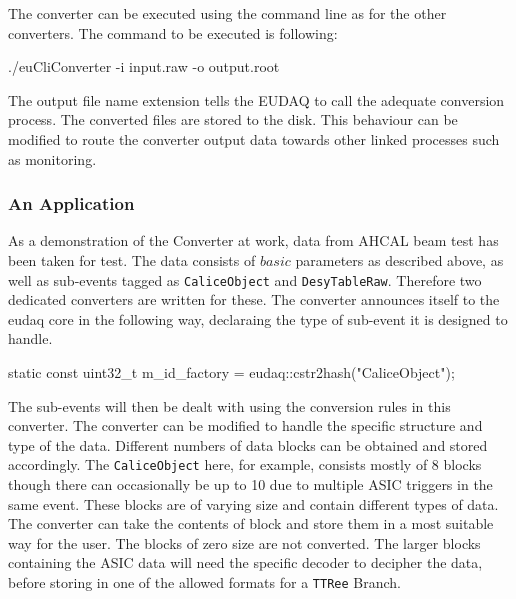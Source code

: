  The converter can be executed using the command line as for the other converters. The command to be executed is following:
\begin{listing}[mybash]
./euCliConverter -i input.raw -o output.root
\end{listing}
 The output file name extension tells the EUDAQ to call the adequate conversion process. The converted files are stored to the disk. This behaviour can be modified to route the converter output data towards other linked processes such as monitoring. 

\subsubsection{An Application} 
As a demonstration of the Converter at work, data from AHCAL beam test has been taken for test. The data consists of $basic$ parameters as described above, as well as sub-events tagged as \lstinline[style=cpp]{CaliceObject} and \lstinline[style=cpp]{DesyTableRaw}. Therefore two dedicated converters are written for these. The converter announces itself to the eudaq core in the following way, declaraing the type of sub-event it is designed to handle.  

\begin{listing}[mybash]
static const uint32_t m_id_factory = eudaq::cstr2hash("CaliceObject");
\end{listing}

The sub-events will then be dealt with using the conversion rules in this converter. The converter can be modified to handle the specific structure and type of the data. Different numbers of data blocks can be obtained and stored accordingly. The \lstinline[style=cpp]{CaliceObject} here, for example, consists mostly of 8 blocks though there can occasionally be up to 10 due to multiple ASIC triggers in the same event. These blocks are of varying size and contain different types of data. The converter can take the contents of block and store them in a most suitable way for the user. The blocks of zero size are not converted. The larger blocks containing the ASIC data will need the specific decoder to decipher the data, before storing in one of the allowed formats for a \lstinline[style=cpp]{TTRee} Branch. 
